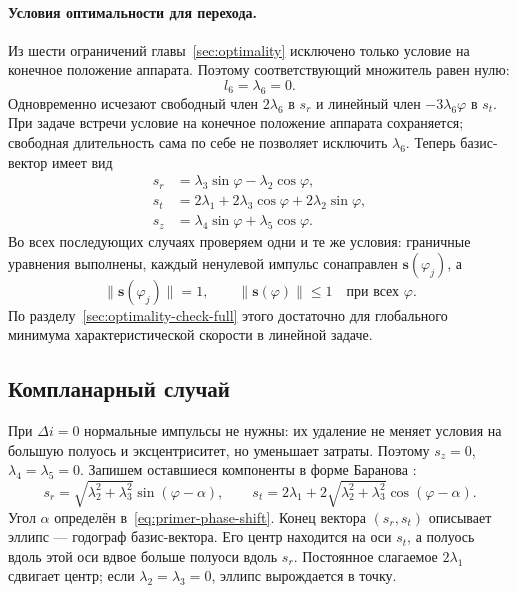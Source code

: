 \paragraph{Условия оптимальности для перехода.}
\label{sec:optimality-check}
Из шести ограничений главы~\ref{sec:optimality} исключено только
условие на конечное положение аппарата. Поэтому соответствующий множитель равен нулю:
\begin{equation}
 l_6=\lambda_6=0.
 \label{eq:transfer-zero-multiplier}
\end{equation}
Одновременно исчезают свободный член $2\lambda_6$ в $s_r$
и линейный член $-3\lambda_6\varphi$ в $s_t$.
При задаче встречи условие на конечное положение аппарата сохраняется;
свободная длительность сама по себе не позволяет исключить $\lambda_6$.
Теперь базис-вектор имеет вид
\begin{equation}
\boxed{\begin{aligned}
 s_r&=\lambda_3\sin\varphi-\lambda_2\cos\varphi,\\
 s_t&=2\lambda_1+2\lambda_3\cos\varphi+2\lambda_2\sin\varphi,\\
 s_z&=\lambda_4\sin\varphi+\lambda_5\cos\varphi.
\end{aligned}}
\label{eq:primer-components}
\end{equation}
Во всех последующих случаях проверяем одни и те же условия:
граничные уравнения выполнены, каждый ненулевой импульс сонаправлен
$\boldsymbol s(\varphi_j)$, а
\[
 \|\boldsymbol s(\varphi_j)\|=1,\qquad
 \|\boldsymbol s(\varphi)\|\leq1\quad\text{при всех }\varphi.
\]
По разделу~\ref{sec:optimality-check-full} этого достаточно для
глобального минимума характеристической скорости в линейной задаче.

\subsection{Компланарный случай}
\label{sec:planar}

При $\Delta i=0$ нормальные импульсы не нужны: их удаление
не меняет условия на большую полуось и эксцентриситет, но уменьшает
затраты. Поэтому $s_z=0$, $\lambda_4=\lambda_5=0$.
Запишем оставшиеся компоненты в форме Баранова \cite[гл.~2]{baranov-ru}:
\begin{equation}
 s_r=\sqrt{\lambda_2^2+\lambda_3^2}\sin(\varphi-\alpha),\qquad
 s_t=2\lambda_1+2\sqrt{\lambda_2^2+\lambda_3^2}\cos(\varphi-\alpha).
 \label{eq:planar-hodograph}
\end{equation}
Угол $\alpha$ определён в~\eqref{eq:primer-phase-shift}.
Конец вектора $(s_r,s_t)$ описывает эллипс --- годограф базис-вектора.
Его центр находится на оси $s_t$, а полуось вдоль этой оси вдвое
больше полуоси вдоль $s_r$. Постоянное слагаемое $2\lambda_1$
сдвигает центр; если $\lambda_2=\lambda_3=0$, эллипс вырождается в точку.

